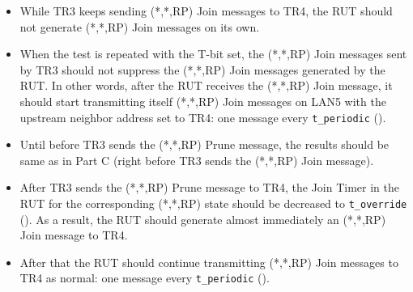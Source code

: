 \documentclass[11pt]{report}
\begin{document}
\begin{itemize}
  \item While TR3 keeps sending (*,*,RP) Join messages to TR4, the RUT should
  not generate (*,*,RP) Join messages on its own.

  \item When the test is repeated with the T-bit set, the (*,*,RP) Join
  messages sent by TR3 should not suppress the (*,*,RP) Join messages
  generated by the RUT. In other words, after the RUT receives the (*,*,RP)
  Join message, it should start transmitting itself (*,*,RP) Join messages on
  LAN5 with the upstream neighbor address set to TR4: one message every
  \verb=t_periodic= ({\PimsmTPeriodic}).

\end{itemize}


\begin{itemize}

  \item Until before TR3 sends the (*,*,RP) Prune message, the results should
  be same as in Part C (right before TR3 sends the (*,*,RP) Join message).

  \item After TR3 sends the (*,*,RP) Prune message to TR4,
  the Join Timer in the RUT for the corresponding (*,*,RP) state
  should be decreased to \verb=t_override= ({\PimsmTOverride}). As a result,
  the RUT should generate almost immediately an (*,*,RP) Join message to TR4.

  \item After that the RUT should continue transmitting 
  (*,*,RP) Join messages to TR4 as normal: one message every \verb=t_periodic=
  ({\PimsmTPeriodic}).

\end{itemize}

\end{document}
